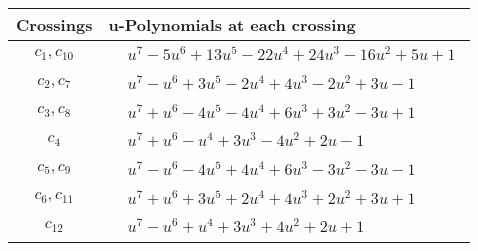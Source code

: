 \documentclass[1p]{elsarticle_modified}
\theoremstyle{definition}
\begin{document}
\begin{tabular}{m{50pt}|m{274pt}}
Crossings & \hspace{64pt}u-Polynomials at each crossing \\
\hline $$\begin{aligned}c_{1},c_{10}\end{aligned}$$&$\begin{aligned}
&u^7-5 u^6+13 u^5-22 u^4+24 u^3-16 u^2+5 u+1
\end{aligned}$\\
\hline $$\begin{aligned}c_{2},c_{7}\end{aligned}$$&$\begin{aligned}
&u^7- u^6+3 u^5-2 u^4+4 u^3-2 u^2+3 u-1
\end{aligned}$\\
\hline $$\begin{aligned}c_{3},c_{8}\end{aligned}$$&$\begin{aligned}
&u^7+u^6-4 u^5-4 u^4+6 u^3+3 u^2-3 u+1
\end{aligned}$\\
\hline $$\begin{aligned}c_{4}\end{aligned}$$&$\begin{aligned}
&u^7+u^6- u^4+3 u^3-4 u^2+2 u-1
\end{aligned}$\\
\hline $$\begin{aligned}c_{5},c_{9}\end{aligned}$$&$\begin{aligned}
&u^7- u^6-4 u^5+4 u^4+6 u^3-3 u^2-3 u-1
\end{aligned}$\\
\hline $$\begin{aligned}c_{6},c_{11}\end{aligned}$$&$\begin{aligned}
&u^7+u^6+3 u^5+2 u^4+4 u^3+2 u^2+3 u+1
\end{aligned}$\\
\hline $$\begin{aligned}c_{12}\end{aligned}$$&$\begin{aligned}
&u^7- u^6+u^4+3 u^3+4 u^2+2 u+1
\end{aligned}$\\
\hline
\end{tabular}\\~\\
\end{document}
